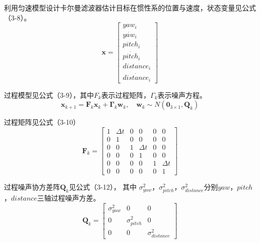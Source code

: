利用匀速模型设计卡尔曼滤波器估计目标在惯性系的位置与速度，状态变量见公式（3-8）。\begin{equation} \boldsymbol x =\left[\begin{array}{c} yaw_i\\ \dot {yaw_i}\\ pitch_i\\ \dot {pitch_i} \\ distance_i\\ \dot {distance_i} \end{array}\right] \end{equation}
\par
过程模型见公式（3-9），其中$F_k$表示过程矩阵，$\Gamma_{k}$表示噪声方程。
\begin{equation} \boldsymbol  x_{k+1} = \boldsymbol F_k\boldsymbol  x_k + \boldsymbol{\Gamma}_{k}\boldsymbol {w}_{k}, \quad \boldsymbol {w}_{k} \sim N\left(\boldsymbol 0_{3 \times 1}, \boldsymbol Q_k \right) \end{equation}

过程矩阵见公式（3-10）
\begin{equation} \boldsymbol F_k =\left[\begin{array}{cccccc} 1 &  \Delta t & 0 &0&0&0\\ 0 &  1 & 0 &0&0&0\\ 0 & 0 & 1&  \Delta t & 0 &0\\ 0&0&   0&1 &0 &0\\ 0 &0& 0 &0& 1 &\Delta t \\ 0 &0& 0 & 0 &0 &1 \end{array}\right] \end{equation}

过程噪声协方差阵$\boldsymbol Q_k$见公式（3-12）， 其中 $\sigma_{yaw}^2$，$\sigma_{pitch}^2$，$\sigma_{distance}^2$分别$yaw$，$pitch$，$distance$三轴过程噪声方差。
\begin{equation} \boldsymbol Q_k =\left[\begin{array}{ccc} \sigma_{yaw}^2 &  0 & 0 \\ 0 &  \sigma_{pitch}^2 & 0 \\ 0 & 0 & \sigma_{distance}^2 \end{array}\right] \end{equation}
\par


